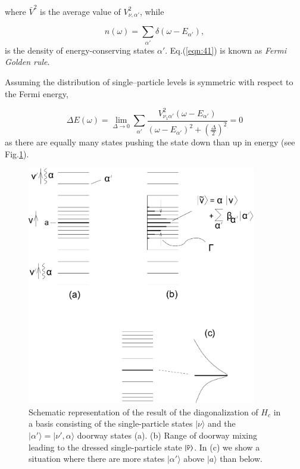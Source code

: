 \noindent where $\bar{V}^2$ is the average value of $V_{\nu ,\alpha'}^2$, while

\begin{equation}
n(\omega) = \sum_{\alpha'} \delta(\omega - E_{\alpha'}) ,
\label{eqn:42}
\end{equation}
is the density of energy-conserving states $\alpha'$. Eq.(\ref{eqn:41}) is known as {\it Fermi Golden rule}.

Assuming the distribution of single--particle levels is symmetric with respect to the Fermi energy,

\begin{equation}
\Delta E(\omega) = \lim_{\Delta \rightarrow 0} \sum_{\alpha'} \frac{V_{\nu_1 \alpha'}^2 (\omega - E_{\alpha'})}{(\omega - E_{\alpha'})^2 + \left( \frac{\Delta}{2} \right)^2} = 0
\end{equation}
as there are equally many states pushing the state down than up in energy (see Fig.\ref{fig:4.5}).

\begin{figure}
\centerline {
\includegraphics*[width=10cm]{introduccion/figs/figintroD5}
}
\caption{Schematic representation of the result of the diagonalization of $H_{c}$ in a basis consisting of the single-particle states $|\nu \rangle$ and the $|\alpha' \rangle=|\nu', {\alpha} \rangle$ doorway states (a). (b) Range of doorway mixing leading to the dressed single-particle state $|{\tilde\nu} \rangle$. In (c) we show a situation where there are more states $|\alpha' \rangle$ above $|a\rangle$ than below.}
\label{fig:4.5}
\end{figure}


